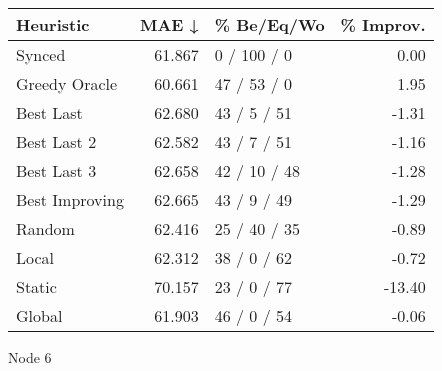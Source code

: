 \begin{tabular}{lrlr}
\toprule
\textbf{Heuristic} & \textbf{MAE ↓} & \textbf{\% Be/Eq/Wo} & \textbf{\% Improv.} \\
\midrule
            Synced &         61.867 &          0 / 100 / 0 &                0.00 \\
     Greedy Oracle &         60.661 &          47 / 53 / 0 &                1.95 \\
         Best Last &         62.680 &          43 / 5 / 51 &               -1.31 \\
       Best Last 2 &         62.582 &          43 / 7 / 51 &               -1.16 \\
       Best Last 3 &         62.658 &         42 / 10 / 48 &               -1.28 \\
    Best Improving &         62.665 &          43 / 9 / 49 &               -1.29 \\
            Random &         62.416 &         25 / 40 / 35 &               -0.89 \\
             Local &         62.312 &          38 / 0 / 62 &               -0.72 \\
            Static &         70.157 &          23 / 0 / 77 &              -13.40 \\
            Global &         61.903 &          46 / 0 / 54 &               -0.06 \\
\bottomrule
\end{tabular}
\caption{Node 6}
\label{tab:iid_lr05_le2_bs2_6}
